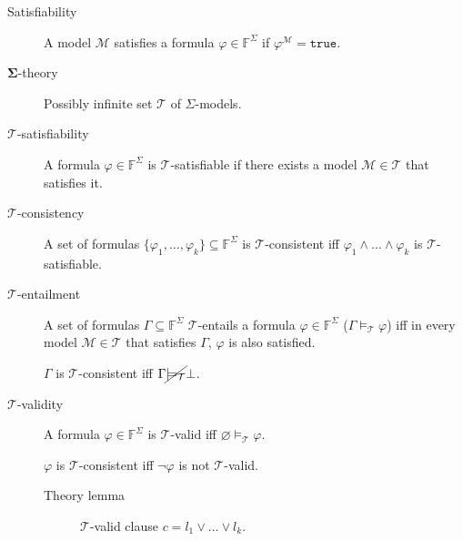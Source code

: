 \begin{description}
    \item[Satisfiability] 
        A model $\mathcal{M}$ satisfies a formula $\varphi \in \mathbb{F}^\Sigma$ if $\varphi^\mathcal{M} = \texttt{true}$.

    \item[$\mathbf{\Sigma}$-theory] 
        Possibly infinite set $\mathcal{T}$ of $\Sigma$-models.

    \item[$\mathbf{\mathcal{T}}$-satisfiability] 
        A formula $\varphi \in \mathbb{F}^\Sigma$ is $\mathcal{T}$-satisfiable if there exists a model $\mathcal{M} \in \mathcal{T}$ that satisfies it.

    \item[$\mathbf{\mathcal{T}}$-consistency] 
        A set of formulas $\{ \varphi_1, \dots, \varphi_k \} \subseteq \mathbb{F}^\Sigma$ is $\mathcal{T}$-consistent iff 
        $\varphi_1 \land \dots \land \varphi_k$ is $\mathcal{T}$-satisfiable.

    \item[$\mathbf{\mathcal{T}}$-entailment] 
        A set of formulas $\Gamma \subseteq \mathbb{F}^\Sigma$ $\mathcal{T}$-entails a formula $\varphi \in \mathbb{F}^\Sigma$ ($\Gamma \models_\mathcal{T} \varphi$) iff
        in every model $\mathcal{M} \in \mathcal{T}$ that satisfies $\Gamma$, $\varphi$ is also satisfied.

        \begin{remark}
            $\Gamma$ is $\mathcal{T}$-consistent iff $\Gamma \cancel{\models_\mathcal{T}} \bot$.
        \end{remark}

    \item[$\mathbf{\mathcal{T}}$-validity] 
        A formula $\varphi \in \mathbb{F}^\Sigma$ is $\mathcal{T}$-valid iff $\varnothing \models_\mathcal{T} \varphi$.

        \begin{remark}
            $\varphi$ is $\mathcal{T}$-consistent iff $\lnot\varphi$ is not $\mathcal{T}$-valid.
        \end{remark}

        \begin{description}
            \item[Theory lemma] 
                $\mathcal{T}$-valid clause $c = l_1 \vee \dots \vee l_k$.
        \end{description}


\end{description}
